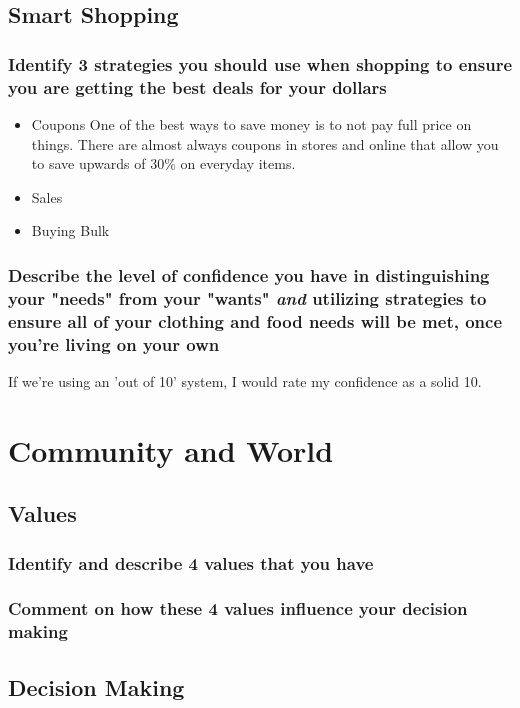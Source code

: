 \documentclass[11pt]{article}
\begin{document}
\subsection*{Smart Shopping}
\label{sec:orgfda0419}
\subsubsection*{Identify 3 strategies you should use when shopping to ensure you are getting the best deals for your dollars}
\label{sec:org232acae}
\begin{itemize}
\item Coupons
\label{sec:org68793a4}
One of the best ways to save money is to not pay full price on things. There are almost always coupons in stores and online that allow you to save upwards of 30\% on everyday items.
\item Sales
\label{sec:org82664ed}
\item Buying Bulk
\label{sec:orgdafcef0}
\end{itemize}
\subsubsection*{Describe the level of confidence you have in distinguishing your "needs" from your "wants" \emph{and} utilizing strategies to ensure all of your clothing and food needs will be met, once you're living on your own}
\label{sec:orgae48aa0}
If we're using an 'out of 10' system, I would rate my confidence as a solid 10. 
\section*{Community and World}
\label{sec:orga1310c3}
\subsection*{Values}
\label{sec:org6ffbd83}
\subsubsection*{Identify and describe 4 values that you have}
\label{sec:org9b625eb}
\subsubsection*{Comment on how these 4 values influence your decision making}
\label{sec:org5b487f3}
\subsection*{Decision Making}
\label{sec:org83af579}
\end{document}

